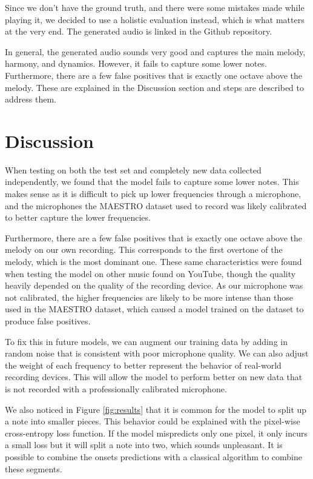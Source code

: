 \documentclass[a4paper,twocolumn,10pt]{article}
\begin{document}
Since we don't have the ground truth, and there were some mistakes made while playing it, we decided to use a holistic evaluation instead, which is what matters at the very end. The generated audio is linked in the Github repository.

In general, the generated audio sounds very good and captures the main melody, harmony, and dynamics. However, it fails to capture some lower notes. Furthermore, there are a few false positives that is exactly one octave above the melody. These are explained in the Discussion section and steps are described to address them.

\section{Discussion}
When testing on both the test set and completely new data collected independently, we found that the model fails to capture some lower notes. This makes sense as it is difficult to pick up lower frequencies through a microphone, and the microphones the MAESTRO dataset used to record was likely calibrated to better capture the lower frequencies.

Furthermore, there are a few false positives that is exactly one octave above the melody on our own recording. This corresponds to the first overtone of the melody, which is the most dominant one. These same characteristics were found when testing the model on other music found on YouTube, though the quality heavily depended on the quality of the recording device. As our microphone was not calibrated, the higher frequencies are likely to be more intense than those used in the MAESTRO dataset, which caused a model trained on the dataset to produce false positives.

To fix this in future models, we can augment our training data by adding in random noise that is consistent with poor microphone quality. We can also adjust the weight of each frequency to better represent the behavior of real-world recording devices. This will allow the model to perform better on new data that is not recorded with a professionally calibrated microphone.

We also noticed in Figure \ref{fig:results} that it is common for the model to split up a note into smaller pieces. This behavior could be explained with the pixel-wise cross-entropy loss function. If the model mispredicts only one pixel, it only incurs a small loss but it will split a note into two, which sounds unpleasant. It is possible to combine the onsets predictions with a classical algorithm to combine these segments.
\end{document}
